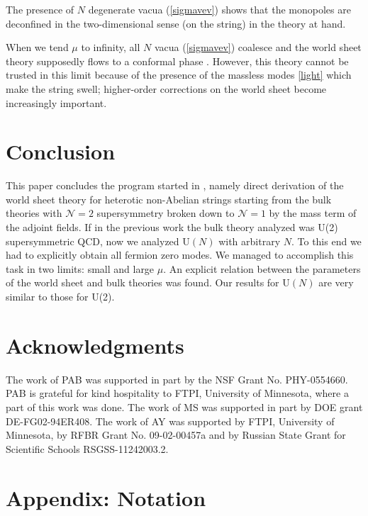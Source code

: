 \documentclass[12pt]{article}
\newcommand{\ntwo}{${\mathcal N}=2$ }
\newcommand{\none}{${\mathcal N}=1$ }
\begin{document}
The presence of $N$ degenerate vacua (\ref{sigmavev}) shows that the monopoles
are deconfined in the two-dimensional sense (on the string) in the theory at hand.

	When we tend $ \mu $  to infinity, all  $N$ vacua (\ref{sigmavev}) coalesce and 
the world sheet theory supposedly flows to
 a conformal phase \cite{SYhetlN}.
	However, this theory cannot be trusted in this limit because of the presence
	of the massless modes \eqref{light} which make the string swell;  higher-order 
corrections on
	the world sheet become increasingly important. 





%
%
\section{Conclusion}
\setcounter{equation}{0}


This paper concludes the program started in \cite{SYhet},
namely direct derivation of the world sheet theory for heterotic non-Abelian strings
starting from the bulk theories with \ntwo supersymmetry broken down to \none
by the mass term of the adjoint fields. 
If in the previous work the bulk theory analyzed was U(2)
supersymmetric QCD, now we analyzed U$(N)$ with arbitrary $N$.
To this end we had to explicitly obtain all fermion zero modes.
We managed to accomplish this task in two limits: small and large $\mu $.
An explicit relation between the parameters of the world sheet and bulk theories
was found.  
Our results for U$(N)$ are very similar to those for U(2).


\section*{Acknowledgments}

The work of PAB was supported in part by the NSF Grant No. PHY-0554660. PAB is grateful for kind
hospitality to FTPI, University of Minnesota, where a part of this work was done. 
The work of MS was supported in part by DOE grant DE-FG02-94ER408. 
The work of AY was  supported 
by  FTPI, University of Minnesota, 
by RFBR Grant No. 09-02-00457a 
and by Russian State Grant for 
Scientific Schools RSGSS-11242003.2.

\newpage
\appendix
\section*{Appendix: Notation}
%
%
\end{document}
